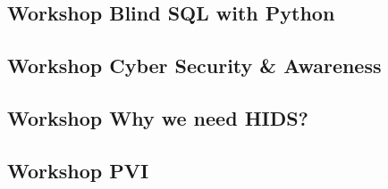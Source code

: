 \documentclass[12pt, letterpaper]{article}
\begin{document}


\newpage
\subsection{Workshop Blind SQL with Python}

\newpage
\subsection{Workshop Cyber Security \& Awareness}


\newpage
\subsection{Workshop Why we need HIDS?}

\newpage
\subsection{Workshop PVI}


\newpage
\end{document}
